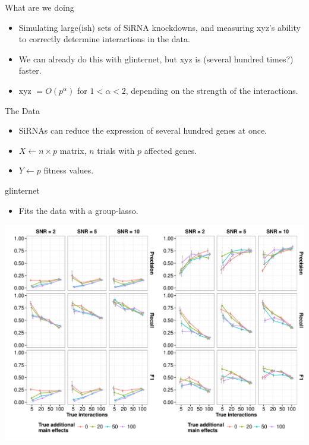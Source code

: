 \begin{frame}{What are we doing}
\begin{itemize}
	\item Simulating large(ish) sets of SiRNA knockdowns, and measuring xyz's ability to correctly determine interactions in the data.
	\item We can already do this with glinternet, but xyz is (several hundred times?) faster.
	\item xyz $= O(p^\alpha)$ for $1 < \alpha < 2$, depending on the strength of the interactions.
\end{itemize}
\end{frame}

\begin{frame}{The Data}
\begin{itemize}
	\item SiRNAs can reduce the expression of several hundred genes at once.
	\item $X \leftarrow n \times p$ matrix, $n$ trials with $p$ affected genes.
	\item $Y \leftarrow p$ fitness values.
\end{itemize}
\end{frame}

\begin{frame}{glinternet}
\centering
	\begin{itemize}
		\item Fits the data with a group-lasso.
	\end{itemize}
	\begin{minipage}{0.8\linewidth}
		\centering
		\includegraphics[width=\linewidth]{"PrecRecF1/glinternet_figure"}
	\end{minipage}
\end{frame}

